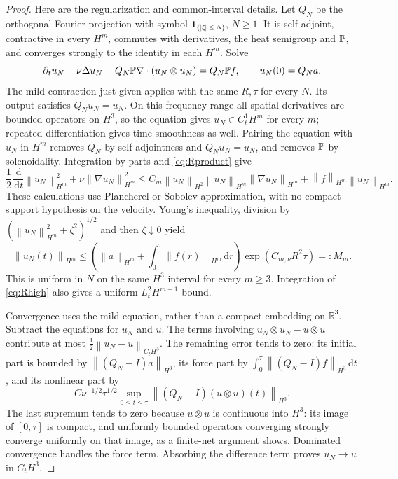 \documentclass[11pt,a4paper]{article}
\theoremstyle{definition}\newtheorem{definition}[theorem]{Definition}
\theoremstyle{remark}\newtheorem{remark}[theorem]{Remark}
\newcommand{\R}{\mathbb R}\newcommand{\TT}{\mathbb T^3}
\newcommand{\dd}{\,\mathrm d}\newcommand{\eps}{\varepsilon}
\newcommand{\norm}[1]{\left\lVert#1\right\rVert}
\begin{document}
\begin{proof}
Here are the regularization and common-interval details. Let $Q_N$ be the orthogonal Fourier projection with symbol $\mathbf1_{\{|\xi|\le N\}}$, $N\ge1$. It is self-adjoint, contractive in every $H^m$, commutes with derivatives, the heat semigroup and $\mathbb P$, and converges strongly to the identity in each $H^m$. Solve
\[
 \partial_tu_N-\nu\Delta u_N
   +Q_N\mathbb P\nabla\cdot(u_N\otimes u_N)=Q_N\mathbb P f,
 \qquad u_N(0)=Q_Na.
\]
The mild contraction just given applies with the same $R,\tau$ for every $N$. Its output satisfies $Q_Nu_N=u_N$. On this frequency range all spatial derivatives are bounded operators on $H^3$, so the equation gives $u_N\in C^1_tH^m$ for every $m$; repeated differentiation gives time smoothness as well. Pairing the equation with $u_N$ in $H^m$ removes $Q_N$ by self-adjointness and $Q_Nu_N=u_N$, and removes $\mathbb P$ by solenoidality. Integration by parts and \eqref{eq:Rproduct} give
\begin{equation}\label{eq:Rhigh}
 \frac12\frac{\dd}{\dd t}\norm{u_N}_{H^m}^2
 +\nu\norm{\nabla u_N}_{H^m}^2
 \le C_m\norm{u_N}_{H^2}\norm{u_N}_{H^m}
                 \norm{\nabla u_N}_{H^m}
       +\norm{f}_{H^m}\norm{u_N}_{H^m}.
\end{equation}
These calculations use Plancherel or Sobolev approximation, with no compact-support hypothesis on the velocity. Young's inequality, division by $(\norm{u_N}_{H^m}^2+\zeta^2)^{1/2}$ and then $\zeta\downarrow0$ yield
\[
 \norm{u_N(t)}_{H^m}
 \le \left(\norm{a}_{H^m}+\int_0^\tau\norm{f(r)}_{H^m}\dd r\right)
       \exp(C_{m,\nu}R^2\tau)=:M_m.
\]
This is uniform in $N$ on the same $H^3$ interval for every $m\ge3$. Integration of \eqref{eq:Rhigh} also gives a uniform $L^2_tH^{m+1}$ bound.

Convergence uses the mild equation, rather than a compact embedding on $\R^3$. Subtract the equations for $u_N$ and $u$. The terms involving $u_N\otimes u_N-u\otimes u$ contribute at most $\frac12\norm{u_N-u}_{C_tH^3}$. The remaining error tends to zero: its initial part is bounded by $\norm{(Q_N-I)a}_{H^3}$, its force part by $\int_0^\tau\norm{(Q_N-I)f}_{H^3}\dd t$, and its nonlinear part by
\[
 C\nu^{-1/2}\tau^{1/2}
 \sup_{0\le t\le\tau}\norm{(Q_N-I)(u\otimes u)(t)}_{H^3}.
\]
The last supremum tends to zero because $u\otimes u$ is continuous into $H^3$: its image of $[0,\tau]$ is compact, and uniformly bounded operators converging strongly converge uniformly on that image, as a finite-net argument shows. Dominated convergence handles the force term. Absorbing the difference term proves $u_N\to u$ in $C_tH^3$.


\end{proof}
\end{document}
